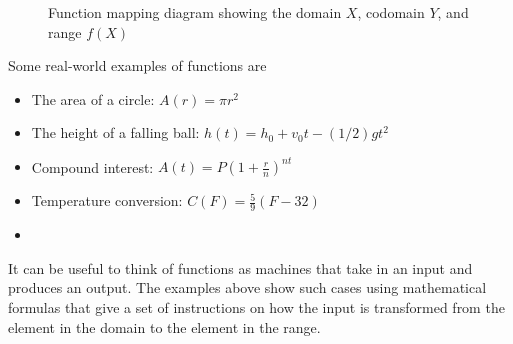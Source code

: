 \begin{figure}[!ht]
    \centering
    \caption{Function mapping diagram showing the domain $X$, codomain $Y$, and range $f(X)$}
    \label{functionmapping}
\end{figure}

\begin{example}
    Some real-world examples of functions are
    \begin{itemize}
        \item The area of a circle: \dotfill $A(r) = \pi r^2$
        \item The height of a falling ball: \dotfill $h(t) = h_0 + v_0 t - (1/2)gt^2$
        \item Compound interest: \dotfill $A(t) = P(1+\frac{r}{n})^{nt}$
        \item Temperature conversion: \dotfill $C(F) = \frac{5}{9}(F - 32)$
        \item %
    \end{itemize}
    It can be useful to think of functions as machines that take in an input and produces an output. The examples above show such cases using mathematical formulas that give a set of instructions on how the input is transformed from the element in the domain to the element in the range.
\end{example}

